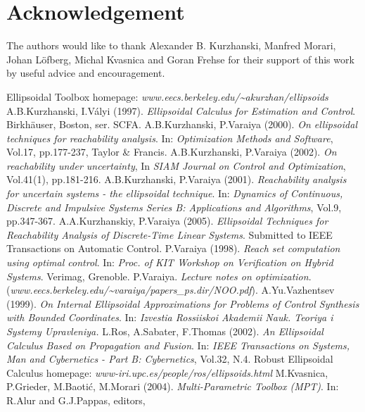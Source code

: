 \documentclass{report}
\begin{document}
\chapter*{Acknowledgement}
The authors would like to thank Alexander B. Kurzhanski,
Manfred Morari, Johan L{\"o}fberg, Michal Kvasnica and Goran Frehse
for their support of this work by useful advice and encouragement.



\begin{thebibliography}{XX}
 Ellipsoidal Toolbox homepage:
{\it www.eecs.berkeley.edu/\~{ }akurzhan/ellipsoids}
 A.B.Kurzhanski, I.V\'{a}lyi (1997). {\it Ellipsoidal
Calculus for Estimation and Control}. Birkh\"{a}user, Boston, ser. SCFA.
 A.B.Kurzhanski, P.Varaiya (2000). {\it On ellipsoidal
techniques for reachability analysis}. In: {\it Optimization Methods and
Software}, Vol.17, pp.177-237, Taylor \& Francis.
 A.B.Kurzhanski, P.Varaiya (2002). {\it On reachability
under uncertainty}, In {\it SIAM Journal on Control and Optimization},
Vol.41(1), pp.181-216.
 A.B.Kurzhanski, P.Varaiya (2001). {\it Reachability analysis
for uncertain systems - the ellipsoidal technique}.
In: {\it Dynamics of Continuous, Discrete and Impulsive Systems Series B:
Applications and Algorithms}, Vol.9, pp.347-367.
 A.A.Kurzhanskiy, P.Varaiya (2005).
{\it Ellipsoidal Techniques for Reachability Analysis of Discrete-Time
Linear Systems}. Submitted to IEEE Transactions on Automatic Control.
 P.Varaiya (1998). {\it Reach set computation
using optimal control}. In: {\it Proc. of KIT Workshop on Verification
on Hybrid Systems}. Verimag, Grenoble.
 P.Varaiya. {\it Lecture notes on optimization}.
({\it www.eecs.berkeley.edu/\~{ }varaiya/papers\_ps.dir/NOO.pdf}).
 A.Yu.Vazhentsev (1999). {\it On Internal Ellipsoidal
Approximations for Problems of Control Synthesis with Bounded Coordinates}.
In: {\it Izvestia Rossiiskoi Akademii Nauk. Teoriya i Systemy Upravleniya.}
 L.Ros, A.Sabater, F.Thomas (2002).
{\it An Ellipsoidal Calculus Based on Propagation and Fusion}. In:
{\it IEEE Transactions on Systems, Man and Cybernetics - Part B: Cybernetics},
Vol.32, N.4.
 Robust Ellipsoidal Calculus homepage:
{\it www-iri.upc.es/people/ros/ellipsoids.html}
 M.Kvasnica, P.Grieder, M.Baoti\'{c}, M.Morari (2004).
{\it Multi-Parametric Toolbox (MPT)}. In: R.Alur and G.J.Pappas, editors,

\end{thebibliography}
\end{document}
